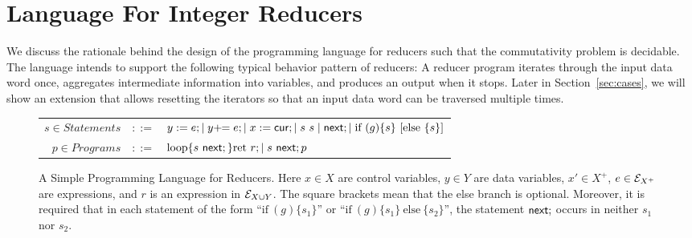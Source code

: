  
\section{Language For Integer Reducers}\label{sec-mr-prog}
\label{sec:language}
We discuss the rationale behind the design of the programming language for reducers such that the commutativity problem is decidable. The language intends to support the following typical behavior pattern of reducers: A reducer program iterates through the input data word once, aggregates intermediate information into variables, and produces an output when it stops. 
%
Later in Section~\ref{sec:cases}, we will show an extension that allows resetting the iterators so that an input data word can be traversed multiple times.
%
\vspace{-2mm}
\begin{figure}
	\centering
	\begin{tabular}{rcl}
        $ s \in Statements$&$::=$&$y := e;\mid y +\!\!= e; \mid x:=\mathsf{cur};\mid s\ s\mid \mathsf{next}; \mid \mbox{if } (g) \{s\} \mbox{ [else } \{s\}\mbox{]}$\\
		$ p\in Programs$&$::=$&$\loopL{s\ \nnext;}\mbox{ret }r; \mid s\ \nnext;p$		
	\end{tabular}
	\caption{A Simple Programming Language for Reducers. Here $x\in X$ are control variables, $y\in Y$ are data variables, $x' \in X^+$, $e\in {\mathcal{E} }_{X^+}$ are expressions, and $r$ is an expression in ${\mathcal{E} }_{X \cup Y}$. The square brackets mean that the else branch is optional. Moreover, it is required that in each statement of the form ``$\mbox{if}\ (g)\{s_1\}$'' or ``$\mbox{if}\ (g)\{s_1\}\ \mbox{else}\ \{s_2\}$'', the statement $\mathsf{next};$ occurs in neither $s_1$ nor $s_2$.}
	\label{fig:language}
\end{figure}

\vspace{-4mm}

